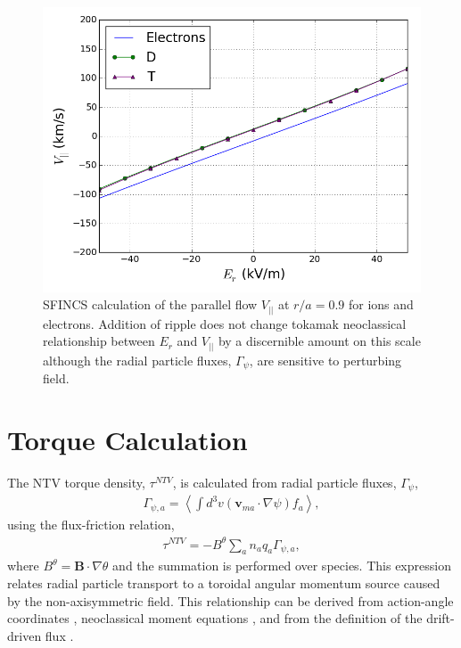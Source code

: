 \documentclass{article}
\numberwithin{figure}{section}
\numberwithin{equation}{section}
\begin{document}
\begin{figure}[h!]
\centering
\includegraphics[width=.7\textwidth]{Er_flow.png}
\caption{\label{fig:Er_flow} SFINCS calculation of the parallel flow $V_{||}$ at $r/a = 0.9$ for ions and electrons. Addition of ripple does not change tokamak neoclassical relationship between $E_r$ and $V_{||}$ by a discernible amount on this scale although the radial particle fluxes, $\Gamma_{\psi}$, are sensitive to perturbing field.}
\end{figure}

\FloatBarrier

\section{Torque Calculation}\label{torque}

The NTV torque density, $\tau^{NTV}$, is calculated from radial particle fluxes, $\Gamma_{\psi}$, 
\begin{gather}
\Gamma_{\psi,a} = \left \langle \int d^3v (\bm{v}_{ma} \cdot \nabla \psi) f_a \right \rangle,
\label{eq:particleflux}
\end{gather}
using the flux-friction relation,
\begin{gather}
\tau^{NTV} = - B^{\theta} \sum_a n_a q_a \Gamma_{\psi, a},
\end{gather}
where $B^{\theta} = \bm{B} \cdot \nabla \theta$ and the summation is performed over species. This expression relates radial particle transport to a toroidal angular momentum source caused by the non-axisymmetric field. This relationship can be derived from action-angle coordinates \cite{Albert2016}, neoclassical moment equations \cite{Shaing1986}, and from the definition of the drift-driven flux \cite{Shaing2006}. 
\end{document}
